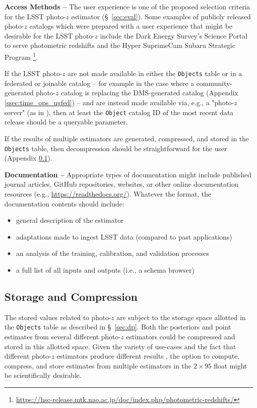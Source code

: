 \documentclass[DM,authoryear,toc]{lsstdoc}
\begin{document}
{\bf Access Methods --} 
The user experience is one of the proposed selection criteria for the LSST photo-$z$ estimator (\S~\ref{sec:eval}). 
Some examples of publicly released photo-$z$ catalogs which were prepared with a user experience that might be desirable for the LSST photo-$z$ include the Dark Energy Survey's Science Portal to serve photometric redshifts \cite{2018A&C....25...58G} and the Hyper SuprimeCam Subaru Strategic Program \cite{2018PASJ...70S...9T}\footnote{\url{https://hsc-release.mtk.nao.ac.jp/doc/index.php/photometric-redshifts/}}.

If the LSST photo-$z$ are not made available in either the {\tt Objects} table or in a federated or joinable catalog -- for example in the case where a community-generated photo-$z$ catalog is replacing the DMS-generated catalog (Appendix \ref{ssec:time_ops_ugfed}) -- and are instead made available via, e.g., a "photo-$z$ server" (as in \cite{2018A&C....25...58G}), then at least the {\tt Object} catalog ID of the most recent data release should be a queryable parameter.

If the results of multiple estimators are generated, compressed, and stored in the {\tt Objects} table, then decompression should be straightforward for the user (Appendix \ref{ssec:dp_store}).

{\bf Documentation --} 
Appropriate types of documentation might include published journal articles, GitHub repositories, websites, or other online documentation resources (e.g., \url{https://readthedocs.org/}). Whatever the format, the documentation contents should include: 
\vspace{-15pt}
\begin{itemize}
\item general description of the estimator
\item adaptations made to ingest LSST data (compared to past applications)
\item an analysis of the training, calibration, and validation processes
\item a full list of all inputs and outputs (i.e., a schema browser)
\end{itemize}

\subsection{Storage and Compression}\label{ssec:dp_store}

The stored values related to photo-$z$ are subject to the storage space allotted in the {\tt Objects} table as described in \S~\ref{sec:dp}.
Both the posteriors and point estimates from several different photo-$z$ estimators could be compressed and stored in this allotted space.
Given the variety of use-cases and the fact that different photo-$z$ estimators produce different results \citep{2020MNRAS.499.1587S}, the option to compute, compress, and store estimates from multiple estimators in the $2\times95$ float might be scientifically desirable.
\end{document}

